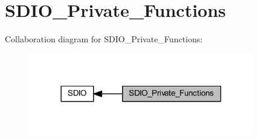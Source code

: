 \hypertarget{group___s_d_i_o___private___functions}{}\section{S\+D\+I\+O\+\_\+\+Private\+\_\+\+Functions}
\label{group___s_d_i_o___private___functions}
Collaboration diagram for S\+D\+I\+O\+\_\+\+Private\+\_\+\+Functions\+:
\nopagebreak
\begin{figure}[H]
\begin{center}
\leavevmode
\includegraphics[width=278pt]{group___s_d_i_o___private___functions}
\end{center}
\end{figure}
